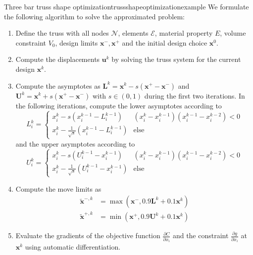 \begin{example}{Three bar truss shape optimization}{trussshapeoptimizationexample}
    We formulate the following algorithm to solve the approximated problem: 
    \begin{enumerate}
        \item Define the truss with all nodes $\mathcal{N}$, elements $\mathcal{E}$, material property $E$, volume constraint $V_0$, design limits $\mathbf{x}^-, \mathbf{x}^+$ and the initial design choice $\mathbf{x}^0$.
        \item Compute the displacements $\mathbf{u}^k$ by solving the truss system for the current design $\mathbf{x}^k$.
        \item Compute the asymptotes as $\mathbf{L}^k =\mathbf{x}^k - s (\mathbf{x}^+ - \mathbf{x}^-)$ and $\mathbf{U}^k =\mathbf{x}^k + s (\mathbf{x}^+ - \mathbf{x}^-)$ with $s \in (0,1)$ during the first two iterations. In the following iterations, compute the lower asymptotes according to 
        \begin{equation}
            L^k_i = 
            \begin{cases}
                x^k_i - s  (x^{k-1}_i-L^{k-1}_i) & (x_i^k-x_i^{k-1})(x_i^{k-1}-x_i^{k-2}) < 0\\
                x^k_i - \frac{1}{\sqrt{s}}  (x^{k-1}_i-L^{k-1}_i) & \text{else}
            \end{cases}
        \end{equation}
        and the upper asymptotes according to 
        \begin{equation}
            U^k_i = 
            \begin{cases}
                x^k_i - s  (U^{k-1}_i-x^{k-1}_i) & (x_i^k-x_i^{k-1})(x_i^{k-1}-x_i^{k-2}) < 0\\
                x^k_i - \frac{1}{\sqrt{s}}  (U^{k-1}_i-x^{k-1}_i) & \text{else}
            \end{cases}
        \end{equation}

        \item Compute the move limits as 
        \begin{align}
            \tilde{\mathbf{x}}^{-,k} &= \max(\mathbf{x}^-,  0.9 \mathbf{L}^k + 0.1 \mathbf{x}^k) \\
            \tilde{\mathbf{x}}^{+,k} &= \min(\mathbf{x}^+,  0.9 \mathbf{U}^k + 0.1 \mathbf{x}^k)
        \end{align}

        \item Evaluate the gradients of the objective function $\frac{\partial C}{\partial x_i}$ and the constraint $\frac{\partial g}{\partial x_i}$ at $\mathbf{x}^k$ using automatic differentiation. 


\end{enumerate}
\end{example}
